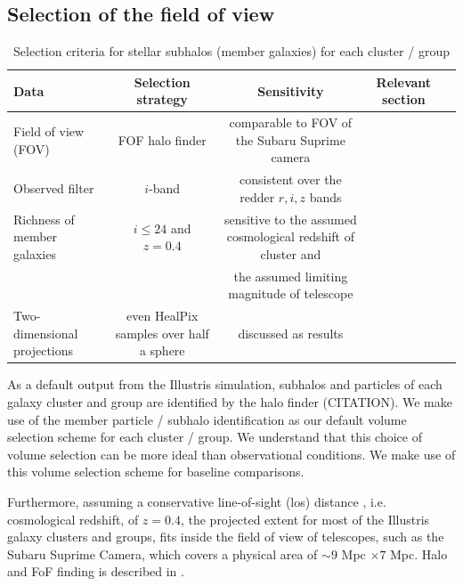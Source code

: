 \subsection{Selection of the field of view}
\label{sec:FOV}

\begin{table}
\begin{center}
\begin{minipage}{180mm} 
	\caption{ Selection criteria for stellar subhalos (member galaxies) for each
		cluster / group 
\label{tab:member_galaxy_selections}} 
	\begin{tabular}{@{}lcccc@{}}
\hline 
Data &  Selection strategy  & Sensitivity & Relevant section  \\ \hline
Field of view (FOV) & FOF halo finder& comparable to FOV of the Subaru
Suprime camera &   \\ 
Observed filter & $i$-band & consistent over the redder $r, i, z$ bands &   \\ 
Richness of member galaxies & $i \leq 24$ and $z = 0.4$  & sensitive to
the assumed cosmological redshift of cluster and &    \\ 
& & the assumed limiting magnitude of telescope &   \\
Two-dimensional projections & even HealPix samples over half a sphere &
discussed as results  & \\  
\hline
\end{tabular} 
\label{tab:selection_criteria} 
\footnotesize{
}
\end{minipage}
\end{center} 
\end{table}

As a default output from the Illustris simulation, subhalos and particles of
each galaxy cluster and group are identified by the halo finder
(CITATION). We make use of the member particle / subhalo identification as our
default volume selection scheme for each cluster / group.
We understand that this choice of volume selection can be more ideal than
observational conditions. We make use of this volume selection scheme
for baseline comparisons. 

Furthermore, assuming a conservative line-of-sight (los) distance 
, i.e. cosmological redshift, of $z = 0.4$, 
the projected extent for most of the Illustris galaxy clusters and groups, 
fits inside the field of view of telescopes, such as the Subaru Suprime Camera,
which covers a physical area of $\sim 9$ Mpc $\times 7$ Mpc. 
Halo and FoF finding is described in \citep{Vogelsberger2014}.

